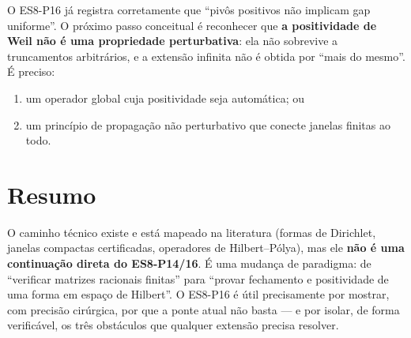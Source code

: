 \documentclass[11pt,a4paper]{article}
\theoremstyle{definition}
\theoremstyle{remark}
\begin{document}
O ES8-P16 já registra corretamente que ``pivôs positivos não implicam gap
uniforme''. O próximo passo conceitual é reconhecer que \textbf{a
positividade de Weil não é uma propriedade perturbativa}: ela não sobrevive a
truncamentos arbitrários, e a extensão infinita não é obtida por ``mais do
mesmo''. É preciso:
\begin{enumerate}[label=(\roman*)]
  \item um operador global cuja positividade seja automática; ou
  \item um princípio de propagação não perturbativo que conecte janelas
        finitas ao todo.
\end{enumerate}

\section*{Resumo}

O caminho técnico existe e está mapeado na literatura (formas de Dirichlet,
janelas compactas certificadas, operadores de Hilbert--Pólya), mas ele
\textbf{não é uma continuação direta do ES8-P14/16}. É uma mudança de
paradigma: de ``verificar matrizes racionais finitas'' para ``provar
fechamento e positividade de uma forma em espaço de Hilbert''. O ES8-P16 é
útil precisamente por mostrar, com precisão cirúrgica, por que a ponte atual
não basta --- e por isolar, de forma verificável, os três obstáculos que
qualquer extensão precisa resolver.
\end{document}
